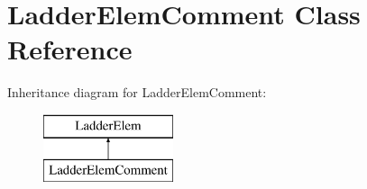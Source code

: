 \hypertarget{class_ladder_elem_comment}{\section{Ladder\-Elem\-Comment Class Reference}
\label{class_ladder_elem_comment}
}
Inheritance diagram for Ladder\-Elem\-Comment\-:\begin{figure}[H]
\begin{center}
\leavevmode
\includegraphics[height=2.000000cm]{class_ladder_elem_comment}
\end{center}
\end{figure}
